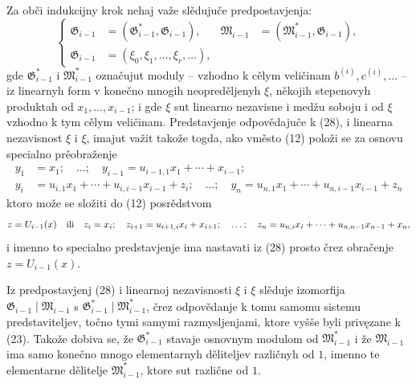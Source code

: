 \documentclass[11pt]{article}
\providecommand{\Gmod}{\mathfrak G}
\providecommand{\Mmod}{\mathfrak M}
\begin{document}
Za obči indukcijny krok nehaj važe slědujuče predpostavjenja:
\begin{equation}
\left\{\begin{aligned}
 \Gmod_{i-1}&=(\Gmod_{i-1}^*,\Gmod_{i-1}),&
 \Mmod_{i-1}&=(\Mmod_{i-1}^*,\Gmod_{i-1}),\\
 \Gmod_{i-1}&=(\xi_0,\xi_1,\ldots,\xi_r,\ldots),
\end{aligned}\right.
\tag{28}
\end{equation}
gde $\Gmod^*_{i-1}$ i $\Mmod^*_{i-1}$ označujut moduly -- vzhodno k cělym veličinam $b^{(i)},c^{(i)},\ldots$ -- iz linearnyh form v konečno mnogih neopreděljenyh $\xi$, někojih stepenovyh produktah od $x_1,\ldots,x_{i-1}$; i gde $\xi$ sut linearno nezavisne i medžu soboju i od $\xi$ vzhodno k tym cělym veličinam. Predstavjenje odpovědajuče k (28), i linearna nezavisnost $\xi$ i $\xi$, imajut važit takože togda, ako vměsto (12) položi se za osnovu specialno prěobraženje
\begin{equation}
\begin{aligned}
 y_1&=x_1;\quad \ldots;\quad y_{i-1}=u_{i-1,1}x_1+\cdots+x_{i-1};\\
 y_i&=u_{i,1}x_1+\cdots+u_{i,i-1}x_{i-1}+z_i;\quad\ldots;\quad
 y_n=u_{n,1}x_1+\cdots+u_{n,i-1}x_{i-1}+z_n
\end{aligned}
\tag{29}
\end{equation}
ktoro može se složiti do (12) posrědstvom
\[
 z=U_{i-1}(x)\quad\hbox{ili}\quad
 z_i=x_i;\quad z_{i+1}=u_{i+1,i}x_i+x_{i+1};\quad\ldots;\quad
 z_n=u_{n,i}x_i+\cdots+u_{n,n-1}x_{n-1}+x_n,
\]
i imenno to specialno predstavjenje ima nastavati iz (28) prosto črez obračenje $z=U_{i-1}(x)$.

Iz predpostavjenj (28) i linearnoj nezavisnosti $\xi$ i $\xi$ slěduje izomorfija $\Gmod_{i-1}\mid\Mmod_{i-1}$ s $\Gmod^*_{i-1}\mid\Mmod^*_{i-1}$, črez odpovědanje k tomu samomu sistemu predstaviteljev, točno tymi samymi razmysljenjami, ktore vyšše byli privęzane k (23). Takože dobiva se, že $\Gmod^*_{i-1}$ stavaje osnovnym modulom od $\Mmod^*_{i-1}$ i že $\Mmod_{i-1}$ ima samo konečno mnogo elementarnyh děliteljev različnyh od $1$, imenno te elementarne dělitelje $\Mmod^*_{i-1}$, ktore sut različne od $1$.
\end{document}
